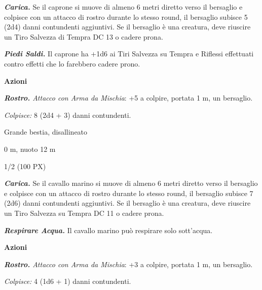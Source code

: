 \begin{multicols}{2}
{\emph{\textbf{Carica.}} Se il caprone si muove di almeno 6 metri diretto verso il bersaglio e colpisce con un attacco di rostro durante lo stesso round, il bersaglio subisce 5 (2d4) danni contundenti aggiuntivi. Se il bersaglio è una creatura, deve riuscire un Tiro Salvezza di Tempra DC 13 o cadere prona.

\emph{\textbf{Piedi Saldi.}} Il caprone ha +1d6 ai Tiri Salvezza su Tempra e Riflessi effettuati contro effetti che lo farebbero cadere prono.

\textbf{Azioni}

\emph{\textbf{Rostro.} Attacco con Arma da Mischia}: +5 a colpire, portata 1 m, un bersaglio.

\emph{Colpisce:} 8 (2d4 + 3) danni contundenti.

\begin{description}[noitemsep, topsep=0pt, parsep=0pt, partopsep=0pt, itemsep=1pt, leftmargin=2.35cm,  labelwidth=2.2cm, itemindent=0cm, listparindent=0pt] %
\setlength{\baselineskip}{10pt}
\item[\textbf{Taglia/Tipo}] Grande bestia, disallineato
\item[\textbf{Caratt.}] 
\item[\textbf{Punti Ferita}] 
\item[\textbf{Tiri Salvez.}] 
\item[\textbf{Movimento}] 0 m, nuoto 12 m
\item[\textbf{Sfida}] 1/2 (100 PX)
\end{description}
\smallskip

\emph{\textbf{Carica.}} Se il cavallo marino si muove di almeno 6 metri diretto verso il bersaglio e colpisce con un attacco di rostro durante lo stesso round, il bersaglio subisce 7 (2d6) danni contundenti aggiuntivi. Se il bersaglio è una creatura, deve riuscire un Tiro Salvezza su Tempra DC 11 o cadere prona.

\emph{\textbf{Respirare Acqua.}} Il cavallo marino può respirare solo sott'acqua.

\textbf{Azioni}

\emph{\textbf{Rostro.} Attacco con Arma da Mischia}: +3 a colpire, portata 1 m, un bersaglio.

\emph{Colpisce:} 4 (1d6 + 1) danni contundenti.

}
\end{multicols}
